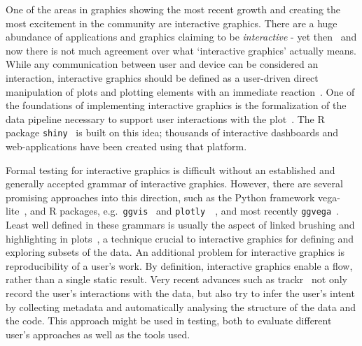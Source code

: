 \documentclass[letterpaper]{ar-1col}\usepackage[]{graphicx}\usepackage[]{color}
\begin{document}
One of the areas in graphics showing the most recent growth and creating the most excitement in the community are interactive graphics.
There are a huge abundance of applications and graphics claiming to be \textit {interactive} - yet then~\citep{debby.interactive} and now there is not much agreement over what `interactive graphics' actually means. While any communication between user and device can be considered an interaction, interactive graphics should be defined as a user-driven direct manipulation of plots and plotting elements with an immediate reaction~\citep{unwin.interactive, becker1987, eick:1995}.
One of the foundations of implementing interactive graphics is the formalization of the data pipeline necessary to support user interactions with the plot~\citep{buja:1988, plumbing, pipeline, cranvas}. The R package \texttt{shiny}~\citep{shiny} is built on this idea; thousands of interactive dashboards and web-applications have been created using that platform.

Formal testing for interactive graphics is difficult without an established and generally accepted grammar of interactive graphics. However, there are several promising approaches into this direction, such as the Python framework vega-lite~\citep{Satyanarayan:cb}, and R packages, e.g.\ \texttt{ggvis}~\citep{ggvis} and \texttt{plotly}~~\citep{plotly}, and most recently \texttt{ggvega}~\citep{ggvega}.
Least well defined in these grammars is usually the aspect of linked brushing and highlighting in plots~\citep{Becker:1987dh}, a technique crucial to interactive graphics for defining and exploring subsets of the data.
An additional problem for interactive graphics is reproducibility of a user's work. By definition, interactive graphics enable a flow, rather than a single static result.
Very recent advances such as trackr~\citep{Becker:2019hp} not only record the user's interactions with the data, but also try to infer the user's intent by collecting metadata and automatically analysing the structure of the data and the code.
This approach might be used in testing, both to evaluate different user's approaches as well as the tools used.
\end{document}
